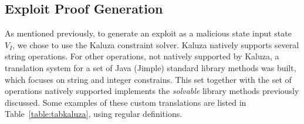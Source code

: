 
\subsection{Exploit Proof Generation}
 \label{section:kaluzaTranslation}

As mentioned previously, to generate an exploit as a malicious state input state $V_I$, we chose to use the Kaluza constraint solver. Kaluza natively supports several string operations. For other operations, not natively supported by Kaluza, a translation system for a set of Java (Jimple) standard library methods was built, which focuses on string and integer constrains. This set together with the set of operations natively supported implements the \emph{solvable} library methods previously discussed. Some examples of these custom translations are listed in Table~\ref{table:tabkaluza}, using regular definitions. 




